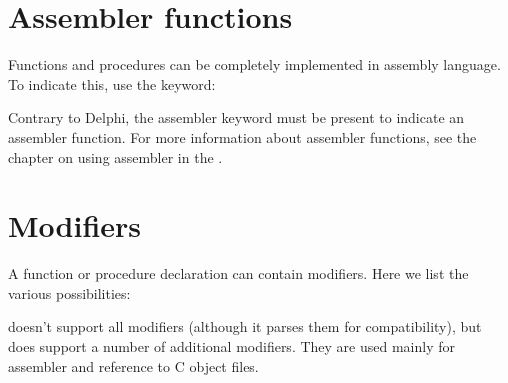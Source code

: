 \section{Assembler functions}
Functions and procedures can be completely implemented in assembly
language. To indicate this, use the  keyword:

Contrary to Delphi, the assembler keyword must be present to indicate an
assembler function.
For more information about assembler functions, see the chapter on using
assembler in the \progref.


\section{Modifiers}
A function or procedure declaration can contain modifiers. Here we list the
various possibilities:

\fpc doesn't support all \tp modifiers (although it parses them for
compatibility), but does support a number of additional modifiers. 
They are used mainly for assembler and reference to C object files.

